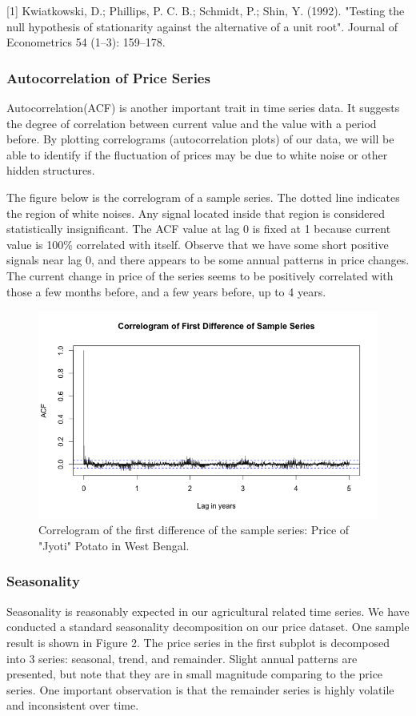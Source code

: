 [1] Kwiatkowski, D.; Phillips, P. C. B.; Schmidt, P.; Shin, Y. (1992). "Testing the null hypothesis of stationarity against the alternative of a unit root". Journal of Econometrics 54 (1–3): 159–178.

\subsubsection*{Autocorrelation of Price Series}
Autocorrelation(ACF) is another important trait in time series data. It suggests the degree of correlation between current value and the value with a period before. By plotting correlograms (autocorrelation plots) of our data, we will be able to identify if the fluctuation of prices may be due to white noise or other hidden structures.

The figure below is the correlogram of a sample series. The dotted line indicates the region of white noises. Any signal located inside that region is considered statistically insignificant. The ACF value at lag 0 is fixed at 1 because current value is 100\% correlated with itself. Observe that we have some short positive signals near lag 0, and there appears to be some annual patterns in price changes. The current change in price of the series seems to be positively correlated with those a few months before, and a few years before, up to 4 years.

\begin{figure}
    \centering
    \includegraphics[width=.7\textwidth]{./img/correlogram.png}
    \caption{Correlogram of the first difference of the sample series: Price of "Jyoti" Potato in West Bengal.}
\end{figure}

\subsubsection*{Seasonality}
Seasonality is reasonably expected in our agricultural related time series. We have conducted a standard seasonality decomposition on our price dataset. One sample result is shown in Figure 2. The price series in the first subplot is decomposed into 3 series: seasonal, trend, and remainder. Slight annual patterns are presented, but note that they are in small magnitude comparing to the price series. One important observation is that the remainder series is highly volatile and inconsistent over time.


